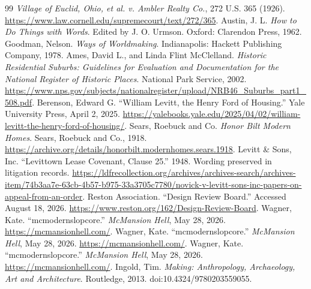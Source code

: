 \documentclass[11pt]{article}
\begin{document}
\begin{thebibliography}{99}
 \emph{Village of Euclid, Ohio, et al. v. Ambler Realty Co.}, 272 U.S. 365 (1926). \url{https://www.law.cornell.edu/supremecourt/text/272/365}.
 Austin, J. L. \emph{How to Do Things with Words}. Edited by J. O. Urmson. Oxford: Clarendon Press, 1962.
 Goodman, Nelson. \emph{Ways of Worldmaking}. Indianapolis: Hackett Publishing Company, 1978.
 Ames, David L., and Linda Flint McClelland. \emph{Historic Residential Suburbs: Guidelines for Evaluation and Documentation for the National Register of Historic Places}. National Park Service, 2002. \url{https://www.nps.gov/subjects/nationalregister/upload/NRB46_Suburbs_part1_508.pdf}.
 Berenson, Edward G. ``William Levitt, the Henry Ford of Housing.'' Yale University Press, April 2, 2025. \url{https://yalebooks.yale.edu/2025/04/02/william-levitt-the-henry-ford-of-housing/}.
 Sears, Roebuck and Co. \emph{Honor Bilt Modern Homes}. Sears, Roebuck and Co., 1918. \url{https://archive.org/details/honorbilt.modernhomes.sears.1918}.
 Levitt \& Sons, Inc. ``Levittown Lease Covenant, Clause 25.'' 1948. Wording preserved in litigation records. \url{https://ldfrecollection.org/archives/archives-search/archives-item/74b3aa7e-63cb-4b57-b975-33a3705c7780/novick-v-levitt-sons-inc-papers-on-appeal-from-an-order}.
 Reston Association. ``Design Review Board.'' Accessed August 18, 2026. \url{https://www.reston.org/162/Design-Review-Board}.
 Wagner, Kate. ``mcmodernslopcore.'' \emph{McMansion Hell}, May 28, 2026. \url{https://mcmansionhell.com/}.
 Wagner, Kate. ``mcmodernslopcore.'' \emph{McMansion Hell}, May 28, 2026. \url{https://mcmansionhell.com/}.
 Wagner, Kate. ``mcmodernslopcore.'' \emph{McMansion Hell}, May 28, 2026. \url{https://mcmansionhell.com/}.
 Ingold, Tim. \emph{Making: Anthropology, Archaeology, Art and Architecture}. Routledge, 2013. doi:10.4324/9780203559055.
\end{thebibliography}
\end{document}
